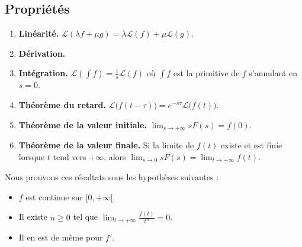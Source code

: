 \documentclass[class=report,crop=false]{standalone}
\begin{document}
  



\subsection{Propriétés}

\begin{proposition}
\label{prop:laplace2}
\begin{enumerate}
  \item \textbf{Linéarité.} $\mathcal{L}(\lambda f +\mu g) = \lambda\mathcal{L}(f)+\mu \mathcal{L}(g)$.
  
  \item \textbf{Dérivation.} 
  
  \item \textbf{Intégration.} $\mathcal{L}(\int f) = \frac1s \mathcal{L}(f)$ 
  où $\int f$ est la primitive de $f$ s'annulant en $s=0$.
  
  \item \textbf{Théorème du retard.} $\mathcal{L}\big(f(t-\tau)\big) = e^{-s\tau}\mathcal{L}\big(f(t)\big)$.

  \item \textbf{Théorème de la valeur initiale.} $\lim_{s\to+\infty} sF(s) =  f(0)$.
  
  \item \textbf{Théorème de la valeur finale.} 
  Si la limite de $f(t)$ existe et est finie lorsque $t$ tend vers $+\infty$,
  alors $\lim_{s\to 0} sF(s) = \lim_{t\to+\infty} f(t)$.
  
\end{enumerate}
\end{proposition}

Nous prouvons ces résultats sous les hypothèses suivantes :
\begin{itemize}
  \item $f$ est continue sur $[0,+\infty[$.

  \item Il existe $n \ge 0$ tel que $\lim_{t\to+\infty} \frac{f(t)}{t^n} = 0$.
  
  \item Il en est de même pour $f'$.
\end{itemize}
\end{document}
